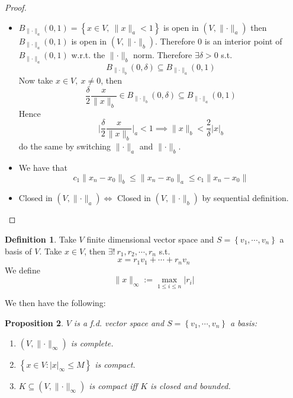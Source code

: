 \documentclass[11pt,a4paper]{article}
\theoremstyle{definition}
\newtheorem{definition}{Definition}[section]
\theoremstyle{plain}
\newtheorem{proposition}[definition]{Proposition}
\theoremstyle{remark}
\renewcommand{\set}[1]{\left\{ #1 \right\}}
\newcommand{\abs}[1]{\lvert #1 \rvert}
\newcommand{\norm}[1]{\lVert #1 \rVert}
\newcommand{\1}{\mathbbm{1}}
\begin{document}
\begin{proof}
    \begin{itemize}
        \item[$(i) \implies (ii)$] $B_{\norm{\cdot}_a} (0,1) = \set{x \in V, \ \norm{x}_a < 1}$ is open in $(V, \norm{\cdot}_a)$ then 
        $B_{\norm{\cdot}_a}(0,1)$ is open in $(V, \norm{\cdot}_b)$. Therefore $0$ is an interior point of $B_{\norm{\cdot}_a}(0,1)$ w.r.t. the $\norm{\cdot}_b$ norm.
        Therefore $\exists \delta > 0$ s.t. 
        $$B_{\norm{\cdot}_b} (0, \delta) \subseteq B_{\norm{\cdot}_a} (0,1)$$
        Now take $x \in V, \ x \ne 0$, then 
        $$\frac{\delta}{2} \frac{x}{\norm{x}_b} \in B_{\norm{\cdot}_b}(0, \delta) \subseteq B_{\norm{\cdot}_a} (0,1)$$
        Hence 
        $$\abs{\frac{\delta}{2} \frac{x}{\norm{x}_b}}_a < 1 \implies \norm{x}_b < \frac{2}{\delta} \abs{x}_b$$
        do the same by switching $\norm{\cdot}_a$ and $\norm{\cdot}_b$. 

        \item[$(ii) \implies (iii)$] We have that 
        $$c_1 \norm{x_n - x_0}_b \le \norm{x_n - x_0}_a \le c_1 \norm{x_n - x_0}$$

        \item[$(iii) \implies (i)$] Closed in $(V, \norm{\cdot}_a) \iff $ Closed in $(V, \norm{\cdot}_b)$ by sequential definition.
    \end{itemize}
\end{proof}

\begin{definition}
    Take $V$ finite dimensional vector space and $S = \set{v_1, \cdots, v_n}$ a basis of $V$. Take $x\in V$, then $\exists ! \ r_1, r_2, \cdots, r_n$ s.t. 
    $$x = r_1 v_1 + \cdots + r_n v_n$$
    We define 
    $$\norm{x}_\infty := \max_{1 \le i \le n} \abs{r_i}$$
\end{definition}

We then have the following: 
\begin{proposition}
    $V$ is a f.d. vector space and $S = \set{v_1, \cdots, v_n}$ a basis: 
    \begin{enumerate}
        \item $(V, \norm{\cdot}_\infty)$ is complete. 
        \item $\set{x \in V \colon \abs{x}_\infty \le M}$ is compact. 
        \item $K \subseteq (V, \norm{\cdot}_\infty)$ is compact iff $K$ is closed and bounded. 
    \end{enumerate}
\end{proposition}
\end{document}
